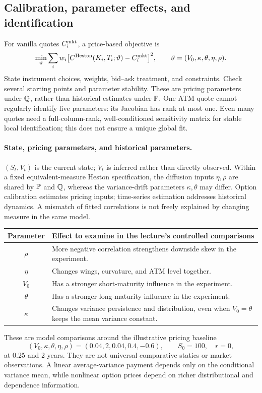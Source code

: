 \subsection{Calibration, parameter effects, and identification}
For vanilla quotes \(C_i^{\rm mkt}\), a price-based objective is
\[
\min_{\vartheta}\sum_i w_i
\bigl[C^{\rm Heston}(K_i,T_i;\vartheta)-C_i^{\rm mkt}\bigr]^2,
\qquad\vartheta=(V_0,\kappa,\theta,\eta,\rho).
\]
State instrument choices, weights, bid--ask treatment, and constraints.
Check several starting points and parameter stability. These are pricing
parameters under \(\mathbb{Q}\), rather than historical estimates under
\(\mathbb{P}\). One ATM quote cannot regularly identify five parameters: its
Jacobian has rank at most one. Even many quotes need a full-column-rank,
well-conditioned sensitivity matrix for stable local identification;
this does not ensure a unique global fit.

\paragraph{State, pricing parameters, and historical parameters.}
\((S_t,V_t)\) is the current state; \(V_t\) is inferred rather than directly
observed. Within a fixed equivalent-measure Heston specification, the
diffusion inputs \(\eta,\rho\) are shared by \(\mathbb{P}\) and \(\mathbb{Q}\),
whereas the variance-drift parameters \(\kappa,\theta\) may differ.
Option calibration estimates pricing inputs; time-series estimation addresses
historical dynamics. A mismatch of fitted correlations is not freely
explained by changing measure in the same model.

\begin{center}
\begin{tabular}{cL{.76\linewidth}}
\toprule Parameter & Effect to examine in the lecture's controlled comparisons\\\midrule
\(\rho\) & More negative correlation strengthens downside skew in the experiment.\\[.3em]
\(\eta\) & Changes wings, curvature, and ATM level together.\\[.3em]
\(V_0\) & Has a stronger short-maturity influence in the experiment.\\[.3em]
\(\theta\) & Has a stronger long-maturity influence in the experiment.\\[.3em]
\(\kappa\) & Changes variance persistence and distribution, even when \(V_0=\theta\) keeps the mean variance constant.\\
\bottomrule
\end{tabular}
\end{center}
These are model comparisons around the illustrative pricing baseline
\[
(V_0,\kappa,\theta,\eta,\rho)=(0.04,2,0.04,0.4,-0.6),
\qquad S_0=100,\quad r=0,
\]
at 0.25 and 2 years. They are not universal
comparative statics or market observations. A linear average-variance
payment depends only on the conditional variance mean, while nonlinear
option prices depend on richer distributional and dependence information.

